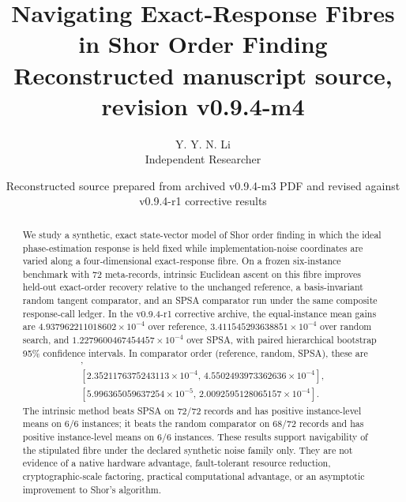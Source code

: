 \documentclass[11pt]{article}
\title{Navigating Exact-Response Fibres in Shor Order Finding\\
\large Reconstructed manuscript source, revision v0.9.4-m4}
\author{Y. Y. N. Li\\Independent Researcher}
\date{Reconstructed source prepared from archived v0.9.4-m3 PDF and revised against v0.9.4-r1 corrective results}
\begin{document}
\maketitle

\begin{center}
\end{center}

\begin{abstract}
We study a synthetic, exact state-vector model of Shor order finding in which
the ideal phase-estimation response is held fixed while implementation-noise
coordinates are varied along a four-dimensional exact-response fibre.  On a
frozen six-instance benchmark with 72 meta-records, intrinsic Euclidean ascent
on this fibre improves held-out exact-order recovery relative to the unchanged
reference, a basis-invariant random tangent comparator, and an SPSA comparator
run under the same composite response-call ledger.  In the v0.9.4-r1
corrective archive, the equal-instance mean gains are
$4.937962211018602\times 10^{-4}$ over reference,
$3.411545293638851\times 10^{-4}$ over random search, and
$1.2279600467454457\times 10^{-4}$ over SPSA, with paired hierarchical
bootstrap 95\% confidence intervals. In comparator order (reference, random,
SPSA), these are
\begin{gather*}
[2.902978897001541\times 10^{-4},\,6.822119290361299\times 10^{-4}],\\
[2.3521176375243113\times 10^{-4},\,4.5502493973362636\times 10^{-4}],\\
[5.996365059637254\times 10^{-5},\,2.0092595128065157\times 10^{-4}].
\end{gather*}
The intrinsic method beats SPSA on 72/72 records and has positive
instance-level means on 6/6 instances; it beats the random comparator on 68/72
records and has positive instance-level means on 6/6 instances.  These results
support navigability of the stipulated fibre under the declared synthetic
noise family only.  They are not evidence of a native hardware advantage,
fault-tolerant resource reduction, cryptographic-scale factoring, practical
computational advantage, or an asymptotic improvement to Shor's algorithm.
\end{abstract}
\end{document}

